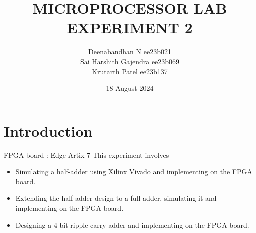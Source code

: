 \documentclass{article}
\title{MICROPROCESSOR LAB EXPERIMENT 2}
\author{Deenabandhan N ee23b021 \\ Sai Harshith Gajendra ee23b069 \\ Krutarth Patel ee23b137}
\date{18 August 2024}
\begin{document}
\maketitle
\section*{Introduction }

FPGA board : Edge Artix 7
This experiment involves 
\begin{itemize}
    \item Simulating a half-adder using Xilinx Vivado and implementing on the FPGA board. 
    \item Extending the half-adder design to a full-adder, simulating it and implementing on the FPGA board. 
    \item Designing a 4-bit ripple-carry adder and implementing on the
            FPGA board.
\end{itemize}
\end{document}
